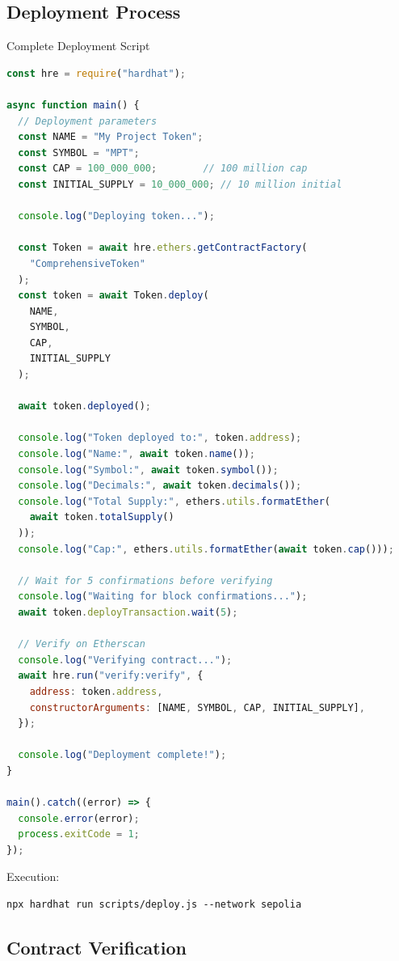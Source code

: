 \documentclass[11pt,a4paper]{article}
\begin{document}
\subsection{Deployment Process}

\begin{examplebox}{Complete Deployment Script}
\begin{lstlisting}[language=JavaScript]
const hre = require("hardhat");

async function main() {
  // Deployment parameters
  const NAME = "My Project Token";
  const SYMBOL = "MPT";
  const CAP = 100_000_000;        // 100 million cap
  const INITIAL_SUPPLY = 10_000_000; // 10 million initial

  console.log("Deploying token...");

  const Token = await hre.ethers.getContractFactory(
    "ComprehensiveToken"
  );
  const token = await Token.deploy(
    NAME,
    SYMBOL,
    CAP,
    INITIAL_SUPPLY
  );

  await token.deployed();

  console.log("Token deployed to:", token.address);
  console.log("Name:", await token.name());
  console.log("Symbol:", await token.symbol());
  console.log("Decimals:", await token.decimals());
  console.log("Total Supply:", ethers.utils.formatEther(
    await token.totalSupply()
  ));
  console.log("Cap:", ethers.utils.formatEther(await token.cap()));

  // Wait for 5 confirmations before verifying
  console.log("Waiting for block confirmations...");
  await token.deployTransaction.wait(5);

  // Verify on Etherscan
  console.log("Verifying contract...");
  await hre.run("verify:verify", {
    address: token.address,
    constructorArguments: [NAME, SYMBOL, CAP, INITIAL_SUPPLY],
  });

  console.log("Deployment complete!");
}

main().catch((error) => {
  console.error(error);
  process.exitCode = 1;
});
\end{lstlisting}

Execution:
\begin{verbatim}
npx hardhat run scripts/deploy.js --network sepolia
\end{verbatim}
\end{examplebox}

\subsection{Contract Verification}
\end{document}
